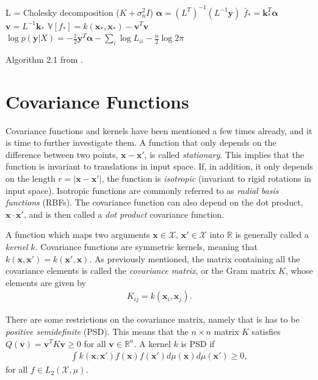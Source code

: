 \documentclass[twoside,english]{uiofysmaster}
\begin{document}
\begin{algorithm}
L = Cholesky decomposition ($K + \sigma_n^2 I$) \;
$\boldsymbol{\alpha} = (L^T)^{-1}(L^{-1} \textbf{y})$ \;
$\bar{f}_* = \textbf{k}_*^T \boldsymbol{\alpha}$ \;
$\textbf{v} = L^{-1} \textbf{k}_*$ \;
$\mathbb{V}[f_*] = k(\textbf{x}_*, \textbf{x}_*) - \textbf{v}^T \textbf{v}$ \;
$\log p(\textbf{y}|X) = - \frac{1}{2} \textbf{y}^T \boldsymbol{\alpha} - \sum_i \log L_{ii} - \frac{n}{2} \log 2 \pi$ \;
\caption{Algorithm 2.1 from \cite{rasmussen2006gaussian}.}
\label{Alg:: gaussian process : GP}
\end{algorithm}

\section{Covariance Functions}
Covariance functions and kernels have been mentioned a few times already, and it is time to further investigate them. A function that only depends on the difference between two points, $\textbf{x} - \textbf{x}'$, is called \textit{stationary}. This implies that the function is invariant to translations in input space. If, in addition, it only depends on the length $r=|\textbf{x}-\textbf{x}'|$, the function is \textit{isotropic} (invariant to rigid rotations in input space).  Isotropic functions are commonly referred to as \textit{radial basis functions} (RBFs). The covariance function can also depend on the dot product, $\textbf{x} \cdot \textbf{x}'$, and is then called a \textit{dot product} covariance function.

A function which maps two arguments $\textbf{x} \in \mathcal{X}$, $\textbf{x}' \in \mathcal{X}$ into $\mathbb{R}$ is generally called a \textit{kernel} $k$. Covariance functions are symmetric kernels, meaning that $k(\textbf{x}, \textbf{x}') = k(\textbf{x}', \textbf{x})$. As previously mentioned, the matrix containing all the covariance elements is called the \textit{covariance matrix}, or the Gram matrix $K$, whose elements are given by
\begin{align}\label{Eq:: covariance matrix}
K_{ij} = k(\textbf{x}_i, \textbf{x}_j).
\end{align}

There are some restrictions on the covariance matrix, namely that is has to be \textit{positive semidefinite} (PSD). This means that the $n \times n $ matrix $K$ satisfies $Q(\textbf{v}) = \textbf{v}^T K \textbf{v} \geq 0 $ for all $\textbf{v} \in \mathbb{R}^n$. A kernel $k$ is PSD if
\begin{align}\label{Eq:: PSD kernel}
\int k(\textbf{x}, \textbf{x}') f(\textbf{x}) f(\textbf{x}') d \mu (\textbf{x}) d \mu (\textbf{x}') \geq 0,
\end{align}
for all $f \in L_2(\mathcal{X}, \mu)$.
\end{document}
